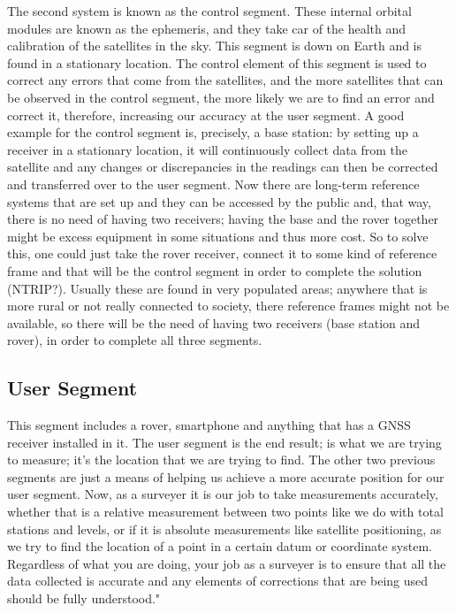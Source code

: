 The second system is known as the control segment. These internal orbital modules are known as the ephemeris, and they take car of the health and calibration of the satellites in the sky. This segment is down on Earth and is found in a stationary location. The control element of this segment is used to correct any errors that come from the satellites, and the more satellites that can be observed in the control segment, the more likely we are to find an error and correct it, therefore, increasing our accuracy at the user segment. A good example for the control segment is, precisely, a base station: by setting up a receiver in a stationary location, it will continuously collect data from the satellite and any changes or discrepancies in the readings can then be corrected and transferred over to the user segment. Now there are long-term reference systems that are set up and they can be accessed by the public and, that way, there is no need of having two receivers; having the base and the rover together might be excess equipment in some situations and thus more cost. So to solve this, one could just take the rover receiver, connect it to some kind of reference frame and that will be the control segment in order to complete the solution (NTRIP?). Usually these are found in very populated areas; anywhere that is more rural or not really connected to society, there reference frames might not be available, so there will be the need of having two receivers (base station and rover), in order to complete all three segments.

\subsection{User Segment}\label{sec:II_gnss_user_seg}

This segment includes a rover, smartphone and anything that has a GNSS receiver installed in it. The user segment is the end result; is what we are trying to measure; it's the location that we are trying to find. The other two previous segments are just a means of helping us achieve a more accurate position for our user segment. Now, as a surveyer it is our job to take measurements accurately, whether that is a relative measurement between two points like we do with total stations and levels, or if it is absolute measurements like satellite positioning, as we try to find the location of a point in a certain datum or coordinate system. Regardless of what you are doing, your job as a surveyer is to ensure that all the data collected is accurate and any elements of corrections that are being used should be fully understood."

